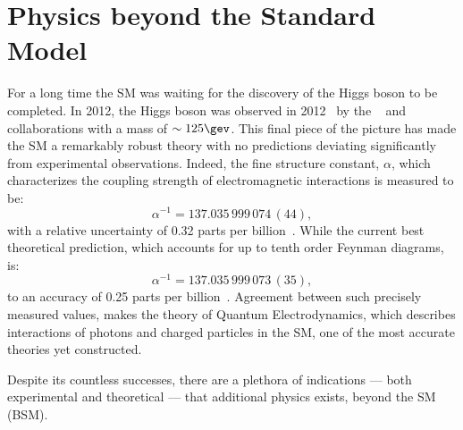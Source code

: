 \section{Physics beyond the Standard Model}

For a long time the SM was waiting for the discovery of the Higgs boson to be completed.
In 2012, the Higgs boson was observed in 2012~\cite{Chatrchyan:2012ufa,Aad:2012tfa} by the
\cms~\cite{Chatrchyan:2012ufa} and \atlas~\cite{Aad:2012tfa} collaborations with a mass of
$\sim125\gev$.
This final piece of the picture has made the SM a remarkably robust theory with no predictions
deviating significantly from experimental observations.
Indeed, the fine structure constant, $\alpha$, which characterizes the coupling strength of
electromagnetic interactions
is measured to be:
\begin{equation}
  \alpha^{-1} = 137.035\,999\,074\,(44),
\end{equation}
with a relative uncertainty of 0.32 parts per billion~\cite{PDG2012}.
While the current best theoretical prediction, which accounts for up to tenth order Feynman
diagrams, is:
\begin{equation}
  \alpha^{-1} = 137.035\,999\,073\,(35),
\end{equation}
to an accuracy of 0.25 parts per billion~\cite{Aoyama:2012wj}.
Agreement between such precisely measured values, makes the theory of Quantum Electrodynamics,
which describes interactions of photons and charged particles in the SM, one of the most accurate
theories yet constructed.

Despite its countless successes, there are a plethora of indications --- both
experimental and theoretical --- that additional physics exists, beyond the SM (BSM).




